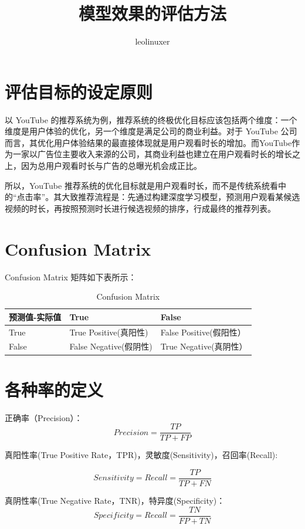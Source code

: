 \documentclass[12pt]{article}
\title{模型效果的评估方法}
\author{leolinuxer}
\begin{document}
\maketitle
\tableofcontents

\section{评估目标的设定原则\cite{Deep_Learning_Recommender_System}}
以 YouTube 的推荐系统为例，推荐系统的终极优化目标应该包括两个维度：一个维度是用户体验的优化，另一个维度是满足公司的商业利益。对于 YouTube 公司而言，其优化用户体验结果的最直接体现就是用户观看时长的增加。而YouTube作为一家以广告位主要收入来源的公司，其商业利益也建立在用户观看时长的增长之上，因为总用户观看时长与广告的总曝光机会成正比。

所以，YouTube 推荐系统的优化目标就是用户观看时长，而不是传统系统看中的“点击率”。其大致推荐流程是：先通过构建深度学习模型，预测用户观看某候选视频的时长，再按照预测时长进行候选视频的排序，行成最终的推荐列表。

\section{Confusion Matrix}
Confusion Matrix 矩阵如下表所示：

\begin{table}[h]
\begin{center}  
\begin{tabular}{|l|l|l|}  
\hline  
预测值-实际值 & True & False \\ \hline  
True &	True Positive(真阳性) &	False Positive(假阳性）\\  \hline
False &	False Negative(假阴性) & True Negative(真阴性）\\  \hline
\end{tabular}  
\end{center}
\caption{Confusion Matrix} 
\end{table}

\section{各种率的定义}
正确率（Precision）：
$$Precision = \frac{TP}{TP+FP}$$

真阳性率(True Positive Rate，TPR)，灵敏度(Sensitivity)，召回率(Recall):

$$Sensitivity = Recall= \frac{TP}{TP+FN}$$

真阴性率(True Negative Rate，TNR)，特异度(Specificity)：
$$Specificity = Recall= \frac{TN}{FP+TN}$$
\end{document}
